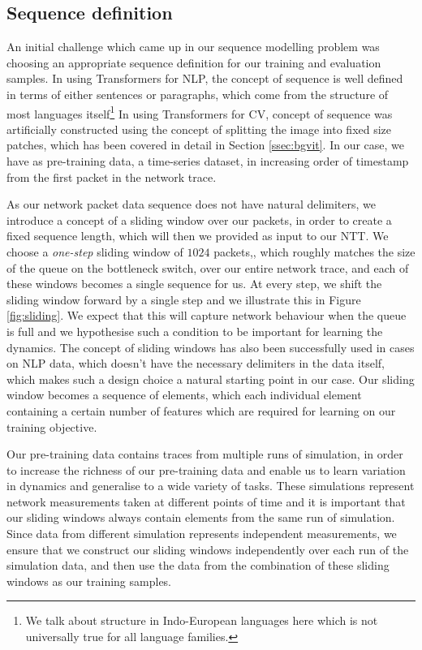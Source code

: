\subsection{Sequence definition}
\label{ssec:desseq}
An initial challenge which came up in our sequence modelling problem was choosing an appropriate sequence definition for our training and evaluation samples. In using Transformers for NLP, the concept of sequence is well defined in terms of either sentences or paragraphs, which come from the structure of most languages itself\footnote{We talk about structure in Indo-European languages here which is not universally true for all language families.} In using Transformers for CV, concept of sequence was artificially constructed using the concept of splitting the image into fixed size patches, which has been covered in detail in Section \ref{ssec:bgvit}. In our case, we have as pre-training data, a time-series dataset, in increasing order of timestamp from the first packet in the network trace.

As our network packet data sequence does not have natural delimiters, we introduce a concept of a sliding window over our packets, in order to create a fixed sequence length, which will then we provided as input to our NTT. We choose a \emph{one-step} sliding window of $1024$ packets,, which roughly matches the size of the queue on the bottleneck switch, over our entire network trace, and each of these windows becomes a single sequence for us. At every step, we shift the sliding window forward by a single step and we illustrate this in Figure \ref{fig:sliding}. We expect that this will capture network behaviour when the queue is full and we hypothesise such a condition to be important for learning the dynamics. The concept of sliding windows has also been successfully used in cases on NLP data, which doesn't have the necessary delimiters in the data itself\cite{beltagyLongformerLongDocumentTransformer2020}, which makes such a design choice a natural starting point in our case. Our sliding window becomes a sequence of elements, which each individual element containing a certain number of features which are required for learning on our training objective.

Our pre-training data contains traces from multiple runs of simulation, in order to increase the richness of our pre-training data and enable us to learn variation in dynamics and generalise to a wide variety of tasks. These simulations represent network measurements taken at different points of time and it is important that our sliding windows always contain elements from the same run of simulation. Since data from different simulation represents independent measurements, we ensure that we construct our sliding windows independently over each run of the simulation data, and then use the data from the combination of these sliding windows as our training samples.

